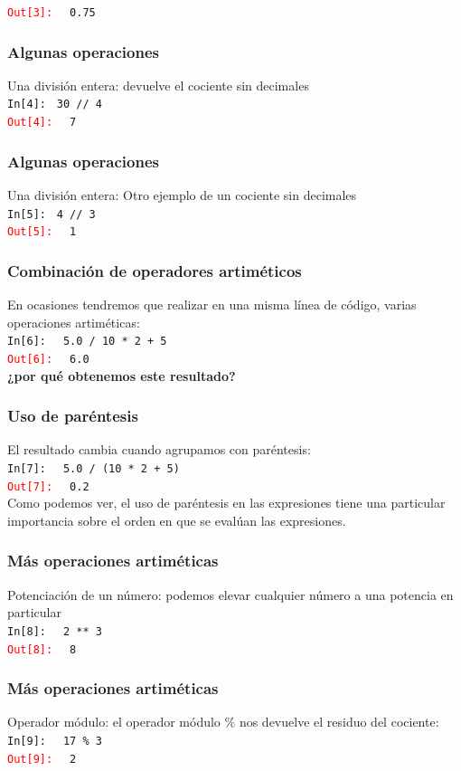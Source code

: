 \documentclass[12pt]{beamer}
\begin{document}
{\begin{frame}[fragile]
\pause
\textcolor{red}{\texttt{Out[3]: }} \verb| 0.75|
\end{frame}
\begin{frame}[fragile]
\frametitle{Algunas operaciones}
Una división entera: devuelve el cociente sin decimales
\\
\bigskip
\textcolor{ao}{\texttt{In[4]: }} \verb|30 // 4| \\
\pause
\textcolor{red}{\texttt{Out[4]: }} \verb| 7|
\end{frame}
\begin{frame}[fragile]
\frametitle{Algunas operaciones}
Una división entera: Otro ejemplo de un cociente sin decimales
\\
\bigskip
\textcolor{ao}{\texttt{In[5]: }} \verb|4 // 3| \\
\pause
\textcolor{red}{\texttt{Out[5]: }} \verb| 1|
\end{frame}
\begin{frame}[fragile]
\frametitle{Combinación de operadores artiméticos}
En ocasiones tendremos que realizar en una misma línea de código, varias operaciones artiméticas:
\\
\bigskip
\textcolor{ao}{\texttt{In[6]: }} \verb| 5.0 / 10 * 2 + 5| \\
\pause
\textcolor{red}{\texttt{Out[6]: }} \verb| 6.0|
\pause
\\
\bigskip
\textbf{¿por qué obtenemos este resultado?}
\end{frame}
\begin{frame}[fragile]
\frametitle{Uso de paréntesis}
El resultado cambia cuando agrupamos con paréntesis:
\\
\bigskip
\textcolor{ao}{\texttt{In[7]: }} \verb| 5.0 / (10 * 2 + 5)| \\
\pause
\textcolor{red}{\texttt{Out[7]: }} \verb| 0.2|
\pause
\\
\bigskip
Como podemos ver, el uso de paréntesis en las expresiones tiene una particular importancia sobre el orden en que se evalúan las expresiones.
\end{frame}
\begin{frame}[fragile]
\frametitle{Más operaciones artiméticas}
Potenciación de un número: podemos elevar cualquier número a una potencia en particular
\\
\bigskip
\textcolor{ao}{\texttt{In[8]: }}  \verb| 2 ** 3| \\
\pause
\textcolor{red}{\texttt{Out[8]: }} \verb| 8|
\end{frame}
\begin{frame}[fragile]
\frametitle{Más operaciones artiméticas}
Operador módulo: el operador módulo $\%$ nos devuelve el residuo del cociente:
\\
\bigskip
\textcolor{ao}{\texttt{In[9]: }} \verb| 17 % 3| \\
\pause
\textcolor{red}{\texttt{Out[9]: }} \verb| 2|
\end{frame}
}
\end{document}
